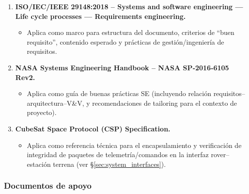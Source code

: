 \begin{enumerate}
    \item \textbf{ISO/IEC/IEEE 29148:2018 – Systems and software engineering — Life cycle processes — Requirements engineering.} \cite{ieee_29148}
    \begin{itemize}
        \item Aplica como marco para estructura del documento, criterios de ``buen requisito'', contenido esperado y prácticas de gestión/ingeniería de requisitos.
    \end{itemize}

    \item \textbf{NASA Systems Engineering Handbook – NASA SP‑2016‑6105 Rev2.} \cite{nasa_se_handbook}
    \begin{itemize}
        \item Aplica como guía de buenas prácticas SE (incluyendo relación requisitos\allowbreak –\allowbreak arquitectura\allowbreak –\allowbreak V\&V, y recomendaciones de tailoring para el contexto de proyecto).
    \end{itemize}

    \item \textbf{CubeSat Space Protocol (CSP) Specification.} \cite{csp_spec}
    \begin{itemize}
        \item Aplica como referencia técnica para el encapsulamiento y verificación de integridad de paquetes de telemetría/comandos en la interfaz rover–estación terrena (ver \S\ref{sec:system_interfaces}).
    \end{itemize}
\end{enumerate}

\subsubsection*{Documentos de apoyo}

